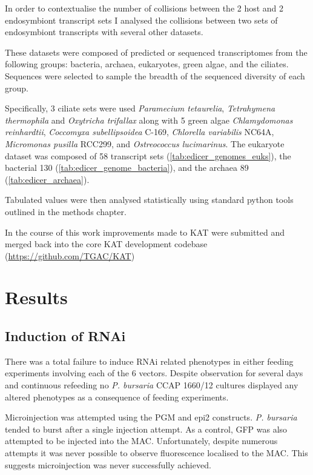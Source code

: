 In order to contextualise the number of collisions between the 2
host and 2 endosymbiont transcript sets
I analysed the collisions between two sets of endosymbiont transcripts 
with several other datasets.  

These datasets were composed of predicted or sequenced transcriptomes 
from the following groups: bacteria, 
archaea, eukaryotes, green algae, and the ciliates.
Sequences were selected to sample the breadth of the sequenced
diversity of each group.

Specifically, 3 ciliate sets were used \textit{Paramecium tetaurelia}, 
\textit{Tetrahymena thermophila} and \textit{Oxytricha trifallax} along with
5 green algae \textit{Chlamydomonas reinhardtii}, \textit{Coccomyxa subellipsoidea}
C-169, \textit{Chlorella variabilis} NC64A, \textit{Micromonas pusilla} RCC299, and
\textit{Ostreococcus lucimarinus}.
The eukaryote dataset was composed of 58 transcript
sets (\cref{tab:edicer_genomes_euks}),
the bacterial 130 (\cref{tab:edicer_genome_bacteria}), and 
the archaea 89 (\cref{tab:edicer_archaea}).

Tabulated values were then analysed statistically
using standard python tools outlined in the methods chapter.

In the course of this work improvements made to KAT were submitted and merged
back into the core KAT development codebase (\url{https://github.com/TGAC/KAT})

\section{Results}

\subsection{Induction of RNAi}

There was a total failure to induce RNAi related phenotypes
in either feeding experiments involving each of the 6 vectors. 
Despite observation for several days and continuous refeeding
no \textit{P. bursaria} CCAP 1660/12 cultures displayed any
altered phenotypes as a consequence of feeding experiments. 

Microinjection was attempted using the PGM and epi2 constructs.
\textit{P. bursaria} tended to burst after a single injection attempt.
As a control, GFP was also attempted to be injected into the MAC.
Unfortunately, despite numerous attempts it was never possible
to observe fluorescence localised to the MAC. This suggests
microinjection was never successfully achieved. 

